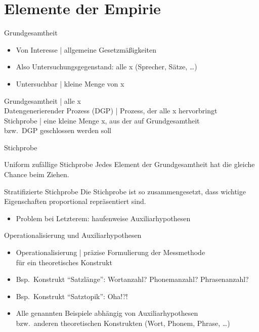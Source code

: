 \section{Elemente der Empirie}

\begin{frame}
  {Grundgesamtheit}
  \begin{itemize}[<+->]
    \item Von Interesse | \alert{allgemeine Gesetzmäßigkeiten}
    \item Also Untersuchungsgegenstand: \alert{alle x} (Sprecher, Sätze, \dots)
    \item Untersuchbar | kleine Menge von x
  \end{itemize}
  \Zeile
  \centering 
  \alert{Grundgesamtheit} | alle x\\
  \Viertelzeile
  \alert{Datengenerierender Prozess (DGP)} | Prozess, der \alert{alle x} hervorbringt\\
  \Zeile
  \alert{Stichprobe} | eine kleine Menge x, aus der auf Grundgesamtheit\\
  bzw.\ DGP geschlossen werden soll
\end{frame}

\begin{frame}
  {Stichprobe}
    \begin{block}{Uniform zufällige Stichprobe}
      Jedes Element der Grundgesamtheit hat die gleiche Chance beim Ziehen.
    \end{block}
    \Zeile
    \begin{block}{Stratifizierte Stichprobe}
      Die Stichprobe ist so zusammengesetzt, dass wichtige Eigenschaften proportional repräsentiert sind.
    \end{block}
    \Zeile
  \begin{itemize}
    \item Problem bei Letzterem: haufenweise Auxiliarhypothesen
  \end{itemize}
\end{frame}

\begin{frame}
  {Operationalisierung und Auxiliarhypothesen}
  \begin{itemize}[<+->]
    \item \alert{Operationalisierung} | präzise Formulierung der Messmethode\\
      für ein theoretisches Konstrukt
      \Zeile
    \item Bsp.\ Konstrukt "`Satzlänge"': Wortanzahl? Phonemanzahl? Phrasenanzahl?
    \item Bsp.\ Konstrukt "`Satztopik"': Oha!?! \citep{CookBildhauer2013}
      \Zeile
    \item Alle genannten Beispiele \alert{abhängig von Auxiliarhypothesen}\\
      bzw.\ anderen theoretischen Konstrukten (Wort, Phonem, Phrase, \dots)
  \end{itemize}
\end{frame}

